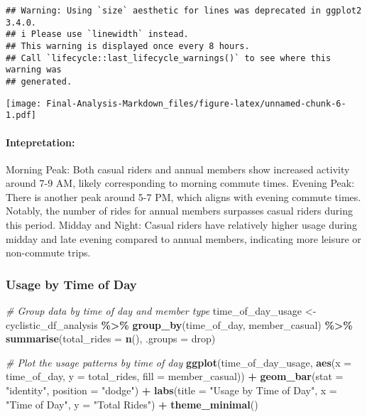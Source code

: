 \documentclass[
]{article}
\newenvironment{Shaded}{\begin{snugshade}}{\end{snugshade}}
\newcommand{\AttributeTok}[1]{\textcolor[rgb]{0.13,0.29,0.53}{#1}}
\newcommand{\CommentTok}[1]{\textcolor[rgb]{0.56,0.35,0.01}{\textit{#1}}}
\newcommand{\FunctionTok}[1]{\textcolor[rgb]{0.13,0.29,0.53}{\textbf{#1}}}
\newcommand{\NormalTok}[1]{#1}
\newcommand{\OtherTok}[1]{\textcolor[rgb]{0.56,0.35,0.01}{#1}}
\newcommand{\SpecialCharTok}[1]{\textcolor[rgb]{0.81,0.36,0.00}{\textbf{#1}}}
\newcommand{\StringTok}[1]{\textcolor[rgb]{0.31,0.60,0.02}{#1}}
\begin{document}
\begin{verbatim}
## Warning: Using `size` aesthetic for lines was deprecated in ggplot2 3.4.0.
## i Please use `linewidth` instead.
## This warning is displayed once every 8 hours.
## Call `lifecycle::last_lifecycle_warnings()` to see where this warning was
## generated.
\end{verbatim}

\texttt{[image: Final-Analysis-Markdown\_files/figure-latex/unnamed-chunk-6-1.pdf]}

\paragraph{Intepretation:}\label{intepretation}

Morning Peak: Both casual riders and annual members show increased
activity around 7-9 AM, likely corresponding to morning commute times.
Evening Peak: There is another peak around 5-7 PM, which aligns with
evening commute times. Notably, the number of rides for annual members
surpasses casual riders during this period. Midday and Night: Casual
riders have relatively higher usage during midday and late evening
compared to annual members, indicating more leisure or non-commute
trips.

\subsubsection{Usage by Time of Day}\label{usage-by-time-of-day}

\begin{Shaded}
\begin{Highlighting}[]
\CommentTok{\# Group data by time of day and member type}
\NormalTok{time\_of\_day\_usage }\OtherTok{\textless{}{-}}\NormalTok{ cyclistic\_df\_analysis }\SpecialCharTok{\%\textgreater{}\%}
  \FunctionTok{group\_by}\NormalTok{(time\_of\_day, member\_casual) }\SpecialCharTok{\%\textgreater{}\%}
  \FunctionTok{summarise}\NormalTok{(}\AttributeTok{total\_rides =} \FunctionTok{n}\NormalTok{(), }\AttributeTok{.groups =} \StringTok{\textquotesingle{}drop\textquotesingle{}}\NormalTok{)}

\CommentTok{\# Plot the usage patterns by time of day}
\FunctionTok{ggplot}\NormalTok{(time\_of\_day\_usage, }\FunctionTok{aes}\NormalTok{(}\AttributeTok{x =}\NormalTok{ time\_of\_day, }\AttributeTok{y =}\NormalTok{ total\_rides, }\AttributeTok{fill =}\NormalTok{ member\_casual)) }\SpecialCharTok{+}
  \FunctionTok{geom\_bar}\NormalTok{(}\AttributeTok{stat =} \StringTok{"identity"}\NormalTok{, }\AttributeTok{position =} \StringTok{"dodge"}\NormalTok{) }\SpecialCharTok{+}
  \FunctionTok{labs}\NormalTok{(}\AttributeTok{title =} \StringTok{"Usage by Time of Day"}\NormalTok{, }\AttributeTok{x =} \StringTok{"Time of Day"}\NormalTok{, }\AttributeTok{y =} \StringTok{"Total Rides"}\NormalTok{) }\SpecialCharTok{+}
  \FunctionTok{theme\_minimal}\NormalTok{()}
\end{Highlighting}
\end{Shaded}
\end{document}
